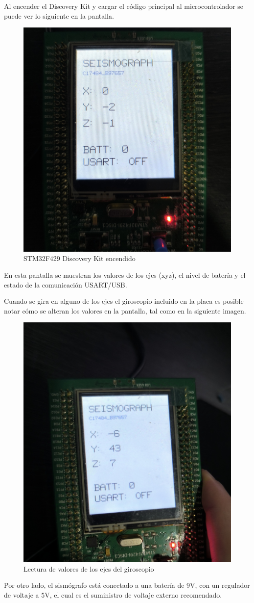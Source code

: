 \documentclass[12pt,a4paper]{article}
\begin{document}
Al encender el Discovery Kit y cargar el código principal al microcontrolador se puede ver lo siguiente en la pantalla.
\begin{figure}[H]
    \centering
    \includegraphics[width=0.5\linewidth]{Imagenes/mcu.jpg}
    \caption{STM32F429 Discovery Kit encendido}
    \label{fig:5}
\end{figure}

En esta pantalla se muestran los valores de los ejes (xyz), el nivel de batería y el estado de la comunicación USART/USB.  

Cuando se gira en alguno de los ejes el giroscopio incluido en la placa es posible notar cómo se alteran los valores en la pantalla, tal como en la siguiente imagen.

\begin{figure}[H]
    \centering
    \includegraphics[width=0.5\linewidth]{Imagenes/gyr.jpg}
    \caption{Lectura de valores de los ejes del giroscopio}
    \label{fig:5}
\end{figure}

Por otro lado, el sismógrafo está conectado a una batería de 9V, con un regulador de voltaje a 5V, el cual es el suministro de voltaje externo recomendado.
\end{document}
